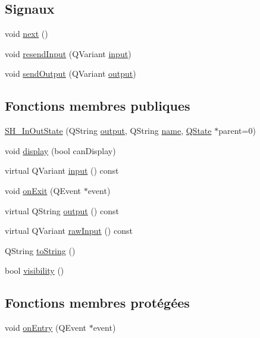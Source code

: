 \subsection*{Signaux}
\begin{DoxyCompactItemize}
\item 
void \hyperlink{classSH__GenericState_a030e67a872956135c52e6876d960a7b5}{next} ()
\item 
void \hyperlink{classSH__InOutState_afa791181eb61a18d4337a04827f9b200}{resend\-Input} (Q\-Variant \hyperlink{classSH__InOutState_a04364c76d2fd8a3781e7b325955e5bd9}{input})
\item 
void \hyperlink{classSH__InOutState_ad40e929a5537eb1d4883d5aa6eee5b15}{send\-Output} (Q\-Variant \hyperlink{classSH__InOutState_a1a2fd4f34484125058e20730aaee7e46}{output})
\end{DoxyCompactItemize}
\subsection*{Fonctions membres publiques}
\begin{DoxyCompactItemize}
\item 
\hyperlink{classSH__InOutState_a5fa88487103a8e197a8453c991bb056b}{S\-H\-\_\-\-In\-Out\-State} (Q\-String \hyperlink{classSH__InOutState_a1a2fd4f34484125058e20730aaee7e46}{output}, Q\-String \hyperlink{classSH__NamedObject_a970f265df31b28b2179bbbceb6170ac2}{name}, \hyperlink{classQState}{Q\-State} $\ast$parent=0)
\item 
void \hyperlink{classSH__InOutState_a918e8a7f5fe00dc16004e46eeee1281d}{display} (bool can\-Display)
\item 
virtual Q\-Variant \hyperlink{classSH__InOutState_a04364c76d2fd8a3781e7b325955e5bd9}{input} () const 
\item 
void \hyperlink{classSH__InOutState_a36636cba0d68476288bce5fd4c041db0}{on\-Exit} (Q\-Event $\ast$event)
\item 
virtual Q\-String \hyperlink{classSH__InOutState_a1a2fd4f34484125058e20730aaee7e46}{output} () const 
\item 
virtual Q\-Variant \hyperlink{classSH__InOutState_a4b1ca094de91c47690ec2d1e95678273}{raw\-Input} () const 
\item 
Q\-String \hyperlink{classSH__GenericState_a5480c5ee725fd801d8f6292cd4c803b8}{to\-String} ()
\item 
bool \hyperlink{classSH__InOutState_a8c496b2fe21a51a587c6e4409c0f37ec}{visibility} ()
\end{DoxyCompactItemize}
\subsection*{Fonctions membres protégées}
\begin{DoxyCompactItemize}
\item 
void \hyperlink{classSH__GenericState_a7c30692635023ce7cf65e5ba5bb18a9c}{on\-Entry} (Q\-Event $\ast$event)
\end{DoxyCompactItemize}
